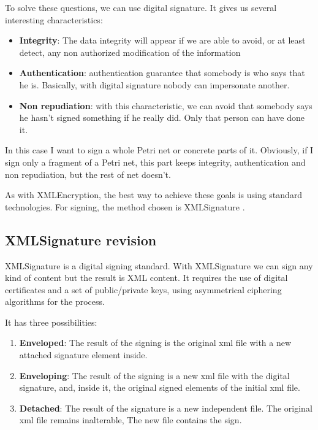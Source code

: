 To solve these questions, we can use digital signature. It gives us several
interesting characteristics:
\begin{itemize}
\item \textbf{Integrity}: The data integrity will appear if we are able to
avoid, or at least detect, any non authorized modification of the information
\item \textbf{Authentication}: authentication guarantee that somebody is
who says that he is. Basically, with digital signature nobody can impersonate another.
\item \textbf{Non repudiation}: with this characteristic, we can avoid that
somebody says he hasn't signed something if he really did. Only that person
can have done it.

\end{itemize}

In this case I want to sign a whole Petri net or concrete parts of it. Obviously,
if I sign only a fragment of a Petri net, this part keeps integrity, authentication
and non repudiation, but the rest of  net doesn't.

As with XMLEncryption, the best way to achieve these goals is using standard
technologies. For signing, the method chosen is XMLSignature \cite{XMLSIG-w3.org/xmlsig-core1}.


\subsection{XMLSignature revision}
XMLSignature is a digital signing standard. With XMLSignature we can sign any kind of content but the result is XML content. It requires the use of
digital certificates and a set of public/private keys, using asymmetrical
ciphering algorithms for the process.

It has three possibilities:

\begin{enumerate}
\item \textbf{Enveloped}: The result of the signing is the original xml file
with a new attached signature element inside.
\item \textbf{Enveloping}: The result of the signing is a new xml file with
the digital signature, and, inside it, the original signed elements of the initial xml file.
\item \textbf{Detached}: The result of the signature is a new independent file.
The original xml file remains inalterable, The new file contains the sign.
\end{enumerate}

